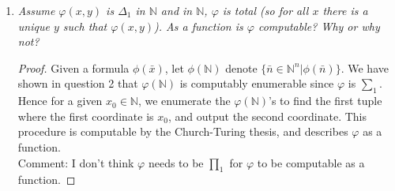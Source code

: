 \documentclass{article}
\begin{document}
\begin{enumerate}[label={\bf Q\arabic*:}]
    \begin{proof}
      Yes $W$ is computably enumerable. If $W$ is finite then it is
      trivially computably enumerable. So assume $W$ is infinite. Now since
      $\varphi$ is $\sum_1$, $\varphi(x)$ is equivalent to $\exists
      y\;\phi(x,y)$ for some $\Delta_0$-formula $\phi$. Fix any
      computable permutation
      $p:\mathbb{N}\rightarrow\mathbb{N}\times\mathbb{N}$, and let $\pi_i$
      denote the $i$th projection function. Consider the function
      $f(n):\mathbb{N}\rightarrow\mathbb{N}$ defined recursively as
      follows: \\

      At input $0$, we find the first $s_0\in\mathbb{N}$ such that
      $\phi(\pi_1(p(s_0)),\pi_2(p(s_0)))$ holds, and output
      $\pi_1(p(s_0))$. Then, at input $n+1$, we find the next
      $s_{n+1}>s_{n}$ such that $\phi(\pi_1(p(s_{n+1})),\pi_2(p(s_{n+1})))$
      holds, and output $\pi_1(p(s_{n+1}))$. Note that the $s_{n}$'s exists
      because $W$ is infinite. Also, given $m,n\in\mathbb{N}$, checking if
      $\phi(m,n)$ holds is al algorithmic procedure that always terminates
      since $\phi$ is $\Delta_0$.  So $f$ is defined by an
      algorithmic procedure and produces an output for every input,
      therefore it is total recursive by the Church-Turing thesis. Also,
      since $p$ is surjective, $f$ will enumerate all elements of $W$. 
    \end{proof}

  \item \it Assume $\varphi(x,y)$ is $\Delta_1$ in $\mathbb{N}$ and
    in $\mathbb{N}$, $\varphi$ is total (so for all $x$ there is a unique
    $y$ such that $\varphi(x,y)$). As a function is $\varphi$ computable?
    Why or why not?

    \begin{proof}
      Given a formula $\phi(\bar{x})$, let $\phi(\mathbb{N})$ denote
      $\{\bar{n}\in\mathbb{N}^n|\phi(\bar{n})\}$. We have shown in
      question 2 that $\varphi(\mathbb{N})$ is computably enumerable since
      $\varphi$ is $\sum_1$. Hence for a given $x_0\in\mathbb{N}$, we
      enumerate the $\varphi(\mathbb{N})$'s to find the first tuple where
      the first coordinate is $x_0$, and output the second coordinate.
      This procedure is computable by the Church-Turing thesis, and
      describes $\varphi$ as a function. \\

      Comment: I don't think $\varphi$ needs to be $\prod_1$ for $\varphi$
      to be computable as a function.
    \end{proof}


\end{enumerate}
\end{document}
